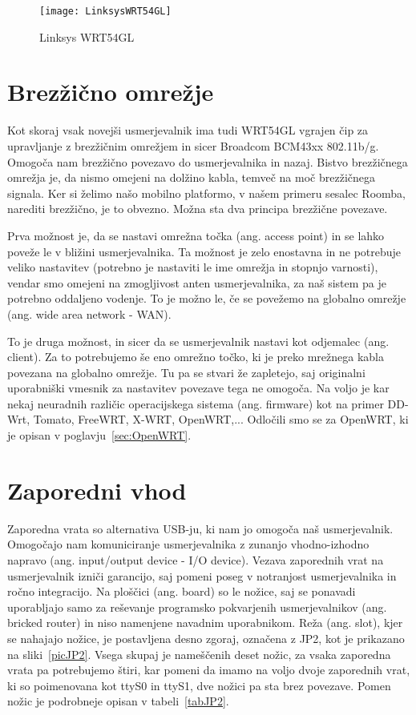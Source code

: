 \documentclass[a4paper, 12pt]{book}
\begin{document}
\begin{figure}[h]
	\centering
	\texttt{[image: LinksysWRT54GL]}
	\caption{Linksys WRT54GL}
	\label{picLinksysWRT54GL}
\end{figure}

\section{Brezžično omrežje}
Kot skoraj vsak novejši usmerjevalnik ima tudi WRT54GL vgrajen čip za upravljanje z brezžičnim omrežjem in sicer Broadcom BCM43xx 802.11b/g. Omogoča nam brezžično povezavo do usmerjevalnika in nazaj. Bistvo brez\-žičnega omrežja je, da nismo omejeni na dolžino kabla, temveč na moč brezžičnega signala. Ker si želimo našo mobilno platformo, v našem primeru sesalec Roomba, narediti brezžično, je to obvezno. Možna sta dva principa brezžične povezave.

Prva možnost je, da se nastavi omrežna točka (ang. access point) in se lahko poveže le v bližini usmerjevalnika. Ta možnost je zelo enostavna in ne potrebuje veliko nastavitev (potrebno je nastaviti le ime omrežja in stopnjo varnosti), vendar smo omejeni na zmogljivost anten usmerjevalnika, za naš sistem pa je potrebno oddaljeno vodenje. To je možno le, če se povežemo na globalno omrežje (ang. wide area network - WAN).

To je druga možnost, in sicer da se usmerjevalnik nastavi kot odjemalec (ang. client). Za to potrebujemo še eno omrežno točko, ki je preko mrežnega kabla povezana na globalno omrežje. Tu pa se stvari že zapletejo, saj originalni uporabniški vmesnik za nastavitev povezave tega ne omogoča. Na voljo je kar nekaj neuradnih različic operacijskega sistema (ang. firmware) kot na primer DD-Wrt, Tomato, FreeWRT, X-WRT, OpenWRT,... Odločili smo se za OpenWRT, ki je opisan v poglavju~\ref{sec:OpenWRT}. 

\section{Zaporedni vhod}
Zaporedna vrata so alternativa USB-ju, ki nam jo omogoča naš usmerjevalnik. Omogočajo nam komuniciranje usmerjevalnika z zunanjo vhodno-izhodno napravo (ang. input/output device - I/O device). Vezava zaporednih vrat na usmerjevalnik izniči garancijo, saj pomeni poseg v notranjost usmerjevalnika in ročno integracijo. Na ploščici (ang. board) so le nožice, saj se ponavadi uporabljajo samo za reševanje programsko pokvarjenih usmerjevalnikov (ang. bricked router) in niso namenjene navadnim uporabnikom. Reža (ang. slot), kjer se nahajajo nožice, je postavljena desno zgoraj, označena z JP2, kot je prikazano na sliki~\ref{picJP2}. Vsega skupaj je nameščenih deset nožic, za vsaka zaporedna vrata pa potrebujemo štiri, kar pomeni da imamo na voljo dvoje zaporednih vrat, ki so poimenovana kot ttyS0 in ttyS1, dve nožici pa sta brez povezave. Pomen nožic je podrobneje opisan v tabeli~\ref{tabJP2}. 
\end{document}

